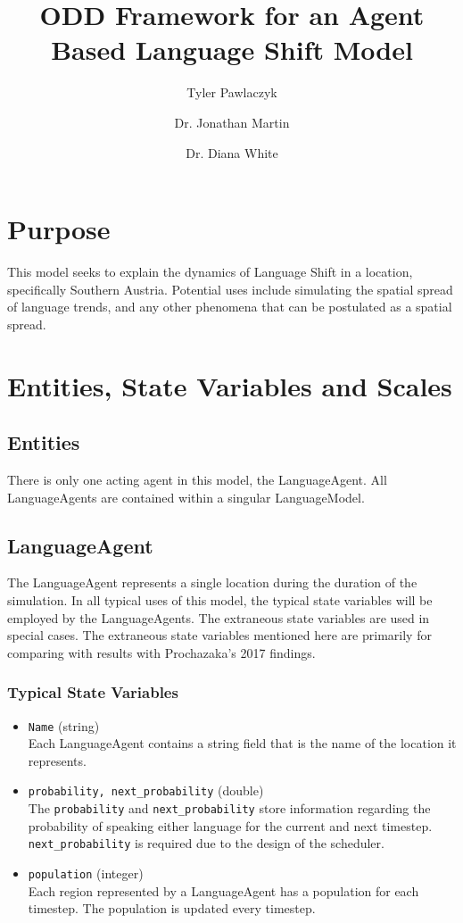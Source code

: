\documentclass{article}
\title{ODD Framework for an Agent Based  Language Shift Model}
\author{Tyler Pawlaczyk \and Dr. Jonathan Martin \and Dr. Diana White}
\begin{document}
\maketitle

\section{Purpose}
This model seeks to explain the dynamics of Language Shift in a location, specifically Southern Austria. Potential uses include simulating the spatial spread of language trends, and any other phenomena that can be postulated as a spatial spread.

\section{Entities, State Variables and Scales}
\subsection{Entities}
There is only one acting agent in this model, the LanguageAgent. All LanguageAgents are contained within a singular LanguageModel.

\subsection{LanguageAgent}
The LanguageAgent represents a single location during the duration of the simulation. In all typical uses of this model, the typical state variables will be employed by the LanguageAgents. The extraneous state variables are used in special cases. The extraneous state variables mentioned here are primarily for comparing with results with Prochazaka's 2017 findings.

\subsubsection{Typical State Variables}
\begin{itemize}
\item \texttt{Name} (string)\\
Each LanguageAgent contains a string field that is the name of the location it represents.

\item \texttt{probability, next\_probability} (double) \\
The \texttt{probability} and \texttt{next\_probability} store information regarding the probability of speaking either language for the current and next timestep. \texttt{next\_probability} is required due to the design of the scheduler.

\item \texttt{population} (integer) \\
Each region represented by a LanguageAgent has a population for each timestep. The population is updated every timestep.

\end{itemize}
\end{document}
